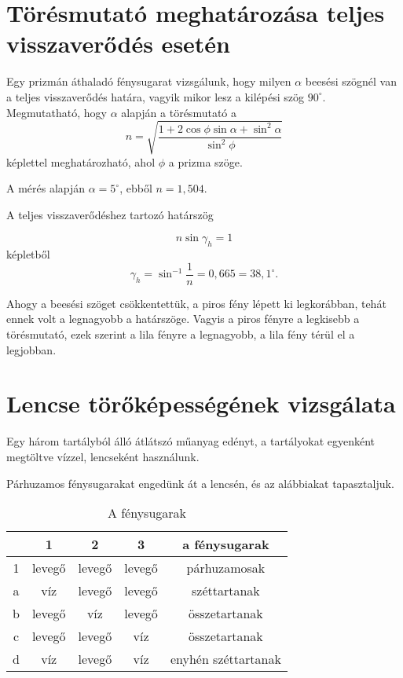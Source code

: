 \documentclass[12pt]{article}
\begin{document}
\section{Törésmutató meghatározása teljes visszaverődés esetén}

Egy prizmán áthaladó fénysugarat vizsgálunk, hogy milyen $\alpha$ beesési szögnél van a teljes visszaverődés határa, vagyik mikor lesz a kilépési szög $90^\circ$. Megmutatható, hogy $\alpha$ alapján a törésmutató a \[ n = \sqrt{\frac{1+2 \cos \phi \sin \alpha + \sin^2 \alpha}{\sin^2 \phi}} \] képlettel meghatározható, ahol $\phi$ a prizma szöge.

A mérés alapján $\alpha = 5^\circ$, ebből $n=\ensuremath{1,504}$.

A teljes visszaverődéshez tartozó határszög

\[n \sin \gamma_h = 1\]
képletből \[\gamma_h = \sin^{-1} \frac 1n = \ensuremath{0,665} = \ensuremath{38,1} ^\circ.\]

Ahogy a beesési szöget csökkentettük, a piros fény lépett ki legkorábban, tehát ennek volt a legnagyobb a határszöge. Vagyis a piros fényre a legkisebb a törésmutató, ezek szerint a lila fényre a legnagyobb, a lila fény térül el a legjobban.


\section{Lencse törőképességének vizsgálata}

Egy három tartályból álló átlátszó műanyag edényt, a tartályokat egyenként megtöltve vízzel, lencseként használunk.


\vskip 50mm

Párhuzamos fénysugarakat engedünk át a lencsén, és az alábbiakat tapasztaljuk.

  
  \begin{table}[H]
    \begin{center}
      \begin{tabular}{|
c|
c|
c|
c|
c|
}
        \hline
        
 & 
1 & 2 & 3 & a fénysugarak
\\
        \hline\hline
        
1
 & levegő
 & levegő
 & levegő
 & párhuzamosak
\\
        \hline
        
a
 & víz
 & levegő
 & levegő
 & széttartanak
\\
        \hline
        
b
 & levegő
 & víz
 & levegő
 & összetartanak
\\
        \hline
        
c
 & levegő
 & levegő
 & víz
 & összetartanak
\\
        \hline
        
d
 & víz
 & levegő
 & víz
 & enyhén széttartanak
\\
        \hline
      \end{tabular}
      \caption{A fénysugarak}
      \label{tab:}
    \end{center}
  \end{table}
\end{document}
